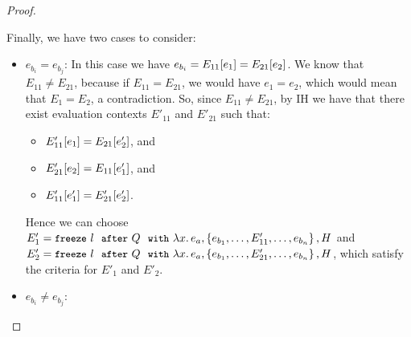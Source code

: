 \begin{proof}
\begin{itemize}
      Finally, we have two cases to consider:
      \begin{itemize}
      \item $e_{b_i} = e_{b_j}$: In this case we have $e_{b_i} =
        E_{11}\hspace{-0.5mm}\left[e_1\right] = E_{21}\hspace{-0.5mm}\left[e_2\right]$.  We know
        that $E_{11} \neq E_{21}$, because if $E_{11} = E_{21}$, we
        would have $e_1 = e_2$, which would mean that $E_1 = E_2$, a
        contradiction.  So, since $E_{11} \neq E_{21}$, by IH we
        have that there exist evaluation contexts $E'_{11}$ and
        $E'_{21}$ such that:
        \begin{itemize}
        \item $E'_{11}\hspace{-0.5mm}\left[e_1\right] = E_{21}\hspace{-0.5mm}\left[e'_2\right]$, and
        \item $E'_{21}\hspace{-0.5mm}\left[e_2\right] = E_{11}\hspace{-0.5mm}\left[e'_1\right]$, and
        \item $E'_{11}\hspace{-0.5mm}\left[e'_1\right] = E'_{21}\hspace{-0.5mm}\left[e'_2\right]$.
        \end{itemize}

        Hence we can choose $E'_1 =
        \mbox{\small{\texttt{freeze}}}~l~~{\mbox{\small{\texttt{after}}}}~Q~~{\mbox{\small{\texttt{with}}}}~\lambda x.\,e_a, \left\{e_{b_1}, \dots,
            E'_{11}, \dots, e_{b_n}\right\}, H$ and $E'_2 =
        \mbox{\small{\texttt{freeze}}}~l~~{\mbox{\small{\texttt{after}}}}~Q~~{\mbox{\small{\texttt{with}}}}~\lambda x.\,e_a, \left\{e_{b_1}, \dots,
            E'_{21}, \dots, e_{b_n}\right\}, H$, which satisfy the criteria
        for $E'_1$ and $E'_2$.

      \item $e_{b_i} \neq e_{b_j}$:

        \TODO{}
      \end{itemize}
  \end{itemize}
\end{proof}

